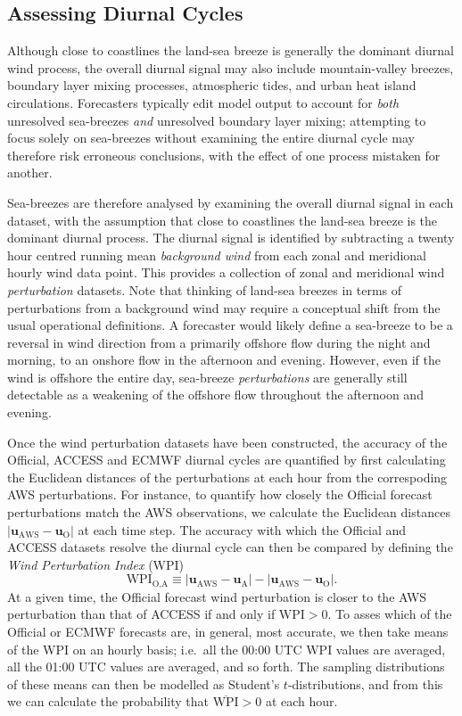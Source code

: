 \documentclass[alpha-refs]{wiley-article}
\begin{document}
\subsection{Assessing Diurnal Cycles}
Although close to coastlines the land-sea breeze is generally the dominant diurnal wind process, the overall diurnal signal may also include mountain-valley breezes, boundary layer mixing processes, atmospheric tides, and urban heat island circulations. Forecasters typically edit model output to account for \emph{both} unresolved sea-breezes \emph{and} unresolved boundary layer mixing; attempting to focus solely on sea-breezes without examining the entire diurnal cycle may therefore risk erroneous conclusions, with the effect of one process mistaken for another.

Sea-breezes are therefore analysed by examining the overall diurnal signal in each dataset, with the assumption that close to coastlines the land-sea breeze is the dominant diurnal process. The diurnal signal is identified by subtracting a twenty hour centred running mean \textit{background wind} from each zonal and meridional hourly wind data point. This provides a collection of zonal and meridional wind \emph{perturbation} datasets. Note that thinking of land-sea breezes in terms of perturbations from a background wind may require a conceptual shift from the usual operational definitions. A forecaster would likely define a sea-breeze to be a reversal in wind direction from a primarily offshore flow during the night and morning, to an onshore flow in the afternoon and evening. However, even if the wind is offshore the entire day, sea-breeze \emph{perturbations} are generally still detectable as a weakening of the offshore flow throughout the afternoon and evening.

Once the wind perturbation datasets have been constructed, the accuracy of the Official, ACCESS and ECMWF diurnal cycles are quantified by first calculating the Euclidean distances of the perturbations at each hour from the correspoding AWS perturbations. For instance, to quantify how closely the Official forecast perturbations match the AWS observations, we calculate the Euclidean distances $\left\lvert \boldsymbol{u}_{\text{AWS}}-\boldsymbol{u}_{\text{O}} \right\rvert$ at each time step. The accuracy with which the Official and ACCESS datasets resolve the diurnal cycle can then be compared by defining the \textit{Wind Perturbation Index} (WPI) 
\begin{equation}
\text{WPI}_\text{O,A} \equiv \left\lvert \boldsymbol{u}_{\text{AWS}}-\boldsymbol{u}_{\text{A}} \right\rvert - \left\lvert \boldsymbol{u}_{\text{AWS}}-\boldsymbol{u}_{\text{O}} \right\rvert.
\end{equation} 
At a given time, the Official forecast wind perturbation is closer to the AWS perturbation than that of ACCESS if and only if $\text{WPI} > 0$. To asses which of the Official or ECMWF forecasts are, in general, most accurate, we then take means of the WPI on an hourly basis; i.e.~all the 00:00 UTC WPI values are averaged, all the 01:00 UTC values are averaged, and so forth. The sampling distributions of these means can then be modelled as Student's $t$-distributions, and from this we can calculate the probability that $\overline{\text{WPI}} > 0$ at each hour.  
\end{document}
